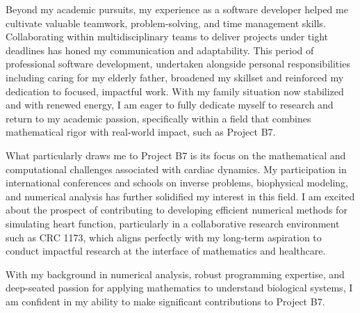 \documentclass[10pt,stdletter,dateno]{newlfm}
\begin{document}
\begin{newlfm}
		Beyond my academic pursuits, my experience as a software developer helped me cultivate valuable teamwork, problem-solving, and time management skills.  Collaborating within multidisciplinary teams to deliver projects under tight deadlines has honed my communication and adaptability. This period of professional software development, undertaken alongside personal responsibilities including caring for my elderly father, broadened my skillset and reinforced my dedication to focused, impactful work.  With my family situation now stabilized and with renewed energy, I am eager to fully dedicate myself to research and return to my academic passion, specifically within a field that combines mathematical rigor with real-world impact, such as Project B7.
		
		
		
		What particularly draws me to Project B7 is its focus on the mathematical and computational challenges associated with cardiac dynamics. My participation in international conferences and schools on inverse problems, biophysical modeling, and numerical analysis has further solidified my interest in this field. I am excited about the prospect of contributing to developing efficient numerical methods for simulating heart function, particularly in a collaborative research environment such as CRC 1173, which aligns perfectly with my long-term aspiration to conduct impactful research at the interface of mathematics and healthcare.
		
		With my background in numerical analysis, robust programming expertise, and deep-seated passion for applying mathematics to understand biological systems, I am confident in my ability to make significant contributions to Project B7. 
		

\end{newlfm}
\end{document}
